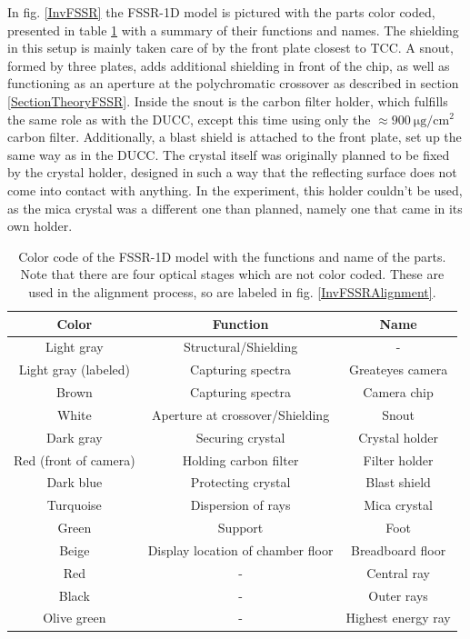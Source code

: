 In fig. \ref{InvFSSR} the FSSR-1D model is pictured with the 
parts 
color coded, presented in table \ref{Table: FSSR colors} with 
a summary of their functions and names. The shielding in this 
setup is mainly taken care of by the front plate closest to TCC. 
A 
snout, formed by three plates, adds additional shielding in 
front of the chip, as well as functioning as an aperture at the 
polychromatic crossover as described in section 
\ref{SectionTheoryFSSR}. Inside the 
snout is the carbon filter 
holder, which fulfills the same role as with the DUCC, except 
this time 
using only the $\approx\SI{900}{\micro\gram\per\cm\squared}$ 
carbon 
filter. Additionally, a blast shield is attached to the front 
plate, 
set up the same way as in the DUCC. The crystal itself was originally planned 
to be fixed 
by the 
crystal holder, designed in such a way that the reflecting 
surface does 
not come into contact with anything. In the experiment, this holder couldn't be 
used, as the mica crystal was a different one than planned, namely one that 
came in its own holder. 

\begin{table}[H]
	\centering
	\caption{Color code of the FSSR-1D model with the functions and 
		name of 
		the parts. Note that there are four optical stages which are not 
		color 
		coded. These are used in the alignment process, so are labeled in 
		fig. 
		\ref{InvFSSRAlignment}.}
	\vspace{0.05cm}
	\renewcommand{\arraystretch}{1.5}
	\centering
	\begin{tabular}{|c|c|c|} 
		\hline
		Color & Function & Name \\ [0.5ex]
		\hline\hline
		Light gray & Structural/Shielding & - \\ 
		[0.5ex]
		\hline
		Light gray (labeled) & Capturing spectra & Greateyes camera \\ 
		[0.5ex]
		\hline
		Brown & Capturing spectra & Camera chip \\ 
		[0.5ex]
		\hline
		White & Aperture at crossover/Shielding & Snout \\ 
		[0.5ex]
		\hline
		Dark gray & Securing crystal & Crystal holder \\ 
		[0.5ex]
		\hline
		Red (front of camera) & Holding carbon filter & 
		Filter holder \\ [0.5ex]
		\hline
		Dark blue & Protecting crystal & Blast shield \\ 
		[0.5ex]
		\hline
		Turquoise & Dispersion of rays & Mica crystal \\ [0.5ex]
		\hline
		Green & Support & Foot \\ 
		[0.5ex]
		\hline
		Beige & Display location of chamber floor & Breadboard floor \\ 
		[0.5ex]
		\hline
		Red & - & Central ray \\ 
		[0.5ex]
		\hline
		Black & - & Outer rays \\ [0.5ex]
		\hline
		Olive green & - & Highest energy ray \\ [0.5ex]
		\hline
	\end{tabular}
	\label{Table: FSSR colors}
\end{table}

